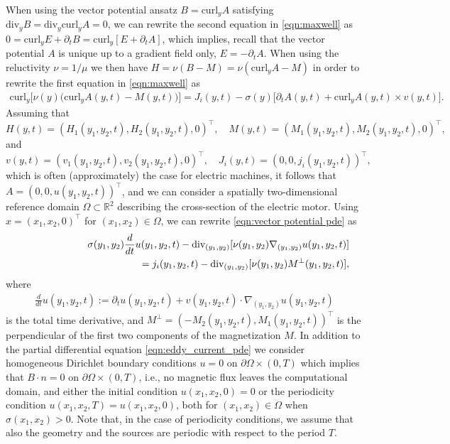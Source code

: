 \documentclass[12pt]{article}
\numberwithin{equation}{section}
\begin{document}
When using the vector potential ansatz $B = \text{curl}_y A$
satisfying $\text{div}_y B = \text{div}_y \text{curl}_y A = 0$,
we can rewrite the second equation in \eqref{eqn:maxwell} as
$0 = \text{curl}_y E + \partial_t B = \text{curl}_y [ E + \partial_t A]$,
which implies, recall that the vector potential $A$ is unique up to a gradient
field only, $E=-\partial_tA$. When using the reluctivity $\nu=1/\mu$ we then
have $H = \nu (B-M) = \nu (\text{curl}_yA-M)$ in order to rewrite the
first equation in \eqref{eqn:maxwell} as
\begin{align}\label{eqn:vector potential pde}
  \text{curl}_y \Big[ \nu(y) \Big(
  \text{curl}_y A(y,t) - M(y,t) \Big) \Big] =
  J_i(y,t) - \sigma(y) \Big[ \partial_t A(y,t) +
  \text{curl}_y A(y,t) \times v(y,t) \Big] .
\end{align}
Assuming that
\[
H(y,t) = (H_1(y_1,y_2,t),H_2(y_1,y_2,t), 0)^\top, \quad
M(y,t) = (M_1(y_1,y_2,t),M_2(y_1,y_2,t), 0)^\top,
\]
and
\[
  v(y,t) = (v_1(y_1, y_2,t),v_2(y_1,y_2,t),0)^\top, \quad
  J_i(y,t) = (0,0,j_i(y_1,y_2,t))^\top,
\]
which is often (approximately) the case for electric machines, it follows
that \linebreak
$A=(0,0,u(y_1,y_2,t))^\top$, and we can consider a spatially
two-dimensional reference domain $\Omega \subset {\mathbb{R}}^2$
describing the cross-section of the electric motor.
Using $x=(x_1,x_2,0)^\top$ for $(x_1,x_2) \in \Omega$, we can rewrite
\eqref{eqn:vector potential pde} as
\begin{eqnarray}\label{eqn:eddy_current_pde}
  && \sigma(y_1,y_2) \frac{d}{dt}u(y_1,y_2,t) - \text{div}_{(y_1,y_2)}
     [\nu(y_1,y_2) \nabla_{(y_1,y_2)} u(y_1,y_2,t)] \\
  && \nonumber \hspace*{4cm} =
  j_i(y_1,y_2,t) - \text{div}_{(y_1,y_2)}[\nu(y_1,y_2) M^\perp(y_1,y_2,t)],
\end{eqnarray}
where
\begin{align*}
  \frac{d}{dt}u(y_1,y_2,t) := \partial_t u(y_1,y_2,t)
  + v(y_1,y_2,t) \cdot \nabla_{(y_1,y_2)} u(y_1,y_2,t)
\end{align*}
is the total time derivative, and
$M^\perp = (-M_2(y_1,y_2,t), M_1(y_1,y_2,t))^\top$ is the
perpendicular of the first two components of the magnetization $M$.
In addition to the partial differential equation
\eqref{eqn:eddy_current_pde} we consider homogeneous
Dirichlet boundary conditions $u=0$ on $\partial \Omega \times (0,T)$
which implies that $B \cdot n = 0$ on $\partial \Omega \times (0,T)$,
i.e., no magnetic flux leaves the computational domain,
and either the initial condition $u(x_1,x_2,0)=0$ or
the periodicity condition $u(x_1,x_2,T)=u(x_1,x_2,0)$, both for $(x_1,x_2)
\in \Omega$ when $\sigma(x_1,x_2) > 0$. Note that, in the case of
periodicity conditions, we assume that also the geometry and the sources
are periodic with respect to the period $T$.
\end{document}
